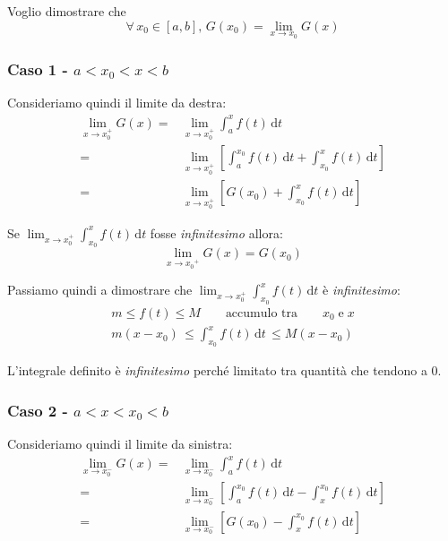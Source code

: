 \documentclass[../../analisi1]{subfiles}
\begin{document}
                Voglio dimostrare che 
                \[\forall \, x_0 \in [a, b], \, G(x_0) = \lim_{x \to  x_0} G(x) \]
            
                \subsubsection*{Caso 1 - \(a < x_0 < x < b \)}

                    Consideriamo quindi il limite da destra:
                    \begin{align*}
                        \lim_{x \to x_0^+} G(x) =& \lim_{x \to x_0^+} \int_a^x \! f(t) \, \mathrm{d}t\\
                        =& \lim_{x \to x_0^+} \left[ \int_a^{x_0} \! f(t) \, \mathrm{d}t + \int_{x_0}^x \! f(t) \, \mathrm{d}t \right]\\
                        =& \lim_{x \to x_0^+} \left[ G(x_0) + \int_{x_0}^x \! f(t) \, \mathrm{d}t \right]
                    \end{align*}

                    Se \( \lim_{x \to x_0^+} \int_{x_0}^x \! f(t) \, \mathrm{d}t \) fosse \emph{infinitesimo} allora:
                    \[  \lim_{x \to {x_0}^{+}}G(x) = G(x_0) \]

                    Passiamo quindi a dimostrare che \( \lim_{x \to x_0^+} \int_{x_0}^x \! f(t) \, \mathrm{d}t \) è \emph{infinitesimo}:
                    \begin{gather*}
                        m \leqslant f(t) \leqslant M \qquad \text {accumulo tra} \qquad x_0 \; \text{e} \; x\\
                        m(x-x_0) \, \leqslant \int_{x_0}^x \! f(t) \, \mathrm{d}t \, \leqslant M(x-x_0)
                    \end{gather*}

                    L'integrale definito è \emph{infinitesimo} perché limitato tra quantità che tendono a 0.

                \subsubsection*{Caso 2 - \(a < x < x_0 < b \)}

                    Consideriamo quindi il limite da sinistra:
                    \begin{align*}
                        \lim_{x \to x_0^-} G(x) =& \lim_{x \to x_0^-} \int_a^x \! f(t) \, \mathrm{d}t\\
                        =& \lim_{x \to x_0^-} \left[ \int_a^{x_0} \! f(t) \, \mathrm{d}t - \int_x^{x_0} \! f(t) \, \mathrm{d}t \right]\\
                        =& \lim_{x \to x_0^-} \left[ G(x_0) - \int_x^{x_0} \! f(t) \, \mathrm{d}t \right]
                    \end{align*}
\end{document}
